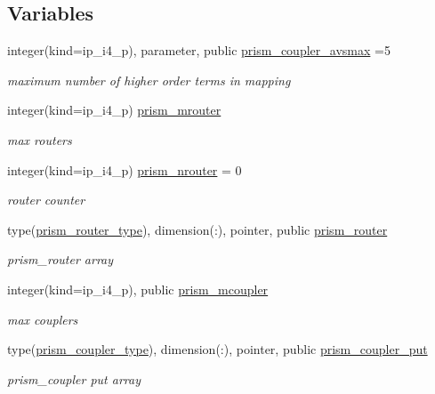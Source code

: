 \subsection*{Variables}
\begin{DoxyCompactItemize}
\item 
integer(kind=ip\+\_\+i4\+\_\+p), parameter, public \hyperlink{namespacemod__oasis__coupler_a6f166f099a134dffba97a168d28a3c01}{prism\+\_\+coupler\+\_\+avsmax} =5
\begin{DoxyCompactList}\small\item\em maximum number of higher order terms in mapping \end{DoxyCompactList}\item 
integer(kind=ip\+\_\+i4\+\_\+p) \hyperlink{namespacemod__oasis__coupler_a6d46883e9df70ab9cdafaf607afacacb}{prism\+\_\+mrouter}
\begin{DoxyCompactList}\small\item\em max routers \end{DoxyCompactList}\item 
integer(kind=ip\+\_\+i4\+\_\+p) \hyperlink{namespacemod__oasis__coupler_a2ebdb255598e1b004de2533f16b06e04}{prism\+\_\+nrouter} = 0
\begin{DoxyCompactList}\small\item\em router counter \end{DoxyCompactList}\item 
type(\hyperlink{structmod__oasis__coupler_1_1prism__router__type}{prism\+\_\+router\+\_\+type}), dimension(\+:), pointer, public \hyperlink{namespacemod__oasis__coupler_a33dbf692ad73f83f73fe083e252badd8}{prism\+\_\+router}
\begin{DoxyCompactList}\small\item\em prism\+\_\+router array \end{DoxyCompactList}\item 
integer(kind=ip\+\_\+i4\+\_\+p), public \hyperlink{namespacemod__oasis__coupler_aaa019c39b0f657e7c37820697ecf354a}{prism\+\_\+mcoupler}
\begin{DoxyCompactList}\small\item\em max couplers \end{DoxyCompactList}\item 
type(\hyperlink{structmod__oasis__coupler_1_1prism__coupler__type}{prism\+\_\+coupler\+\_\+type}), dimension(\+:), pointer, public \hyperlink{namespacemod__oasis__coupler_ae59d8823993d9ca8610efd9770393271}{prism\+\_\+coupler\+\_\+put}
\begin{DoxyCompactList}\small\item\em prism\+\_\+coupler put array \end{DoxyCompactList}\item 

\end{DoxyCompactItemize}
